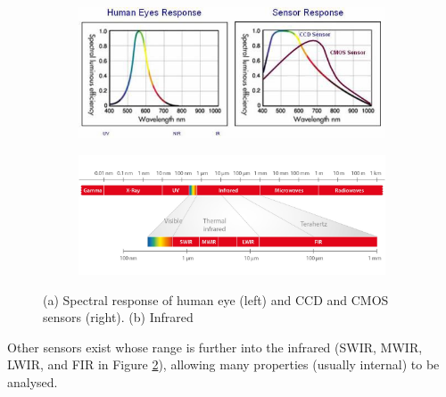 \documentclass[fleqn,twoside,12pt]{report}
\begin{document}
\begin{figure}[h]
	\centering
	\begin{subfigure}{.9\textwidth}
		\centering
		\includegraphics[width=0.9\linewidth]{spectralresponse.jpg}
		\caption{}
		\label{fig:eye_sensor}
	\end{subfigure}

	\begin{subfigure}{.9\textwidth}
		\centering
		\includegraphics[width=.9\linewidth]{infra-red.jpg}
		\caption{}
		\label{fig:ifra-red}
	\end{subfigure}%
	\caption{(a) Spectral response of human eye (left) and CCD and CMOS sensors (right). (b) Infrared}
	\label{fig:spectrum}
\end{figure}%

Other sensors exist whose range is further into the infrared (SWIR, MWIR, LWIR, and FIR in Figure \ref{fig:ifra-red}), allowing many properties (usually internal) to be analysed.
\end{document}
